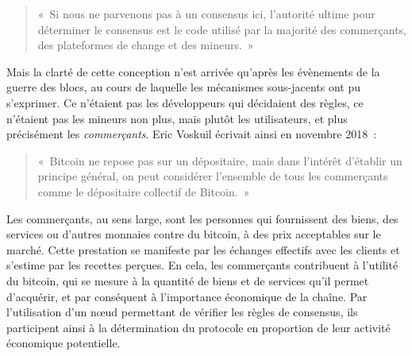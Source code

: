 \begin{quote}
«~Si nous ne parvenons pas à un consensus ici, l'autorité ultime pour déterminer le consensus est le code utilisé par la majorité des commerçants, des plateformes de change et des mineurs.~»
\end{quote} %

Mais la clarté de cette conception n'est arrivée qu'après les évènements de la guerre des blocs, au cours de laquelle les mécanismes sous-jacents ont pu s'exprimer. Ce n'étaient pas les développeurs qui décidaient des règles, ce n'étaient pas les mineurs non plus, mais plutôt les utilisateurs, et plus précisément les \emph{commerçants}. Eric Voskuil écrivait ainsi en novembre 2018~:

\begin{quote}
«~Bitcoin ne repose pas sur un dépositaire, mais dans l'intérêt d'établir un principe général, on peut considérer l'ensemble de tous les commerçants comme le dépositaire collectif de Bitcoin.~»
\end{quote}

Les commerçants, au sens large, sont les personnes qui fournissent des biens, des services ou d'autres monnaies contre du bitcoin, à des prix acceptables sur le marché. Cette prestation se manifeste par les échanges effectifs avec les clients et s'estime par les recettes perçues. En cela, les commerçants contribuent à l'utilité du bitcoin, qui se mesure à la quantité de biens et de services qu'il permet d'acquérir, et par conséquent à l'importance économique de la chaîne. Par l'utilisation d'un nœud permettant de vérifier les règles de consensus, ils participent ainsi à la détermination du protocole en proportion de leur activité économique potentielle.

